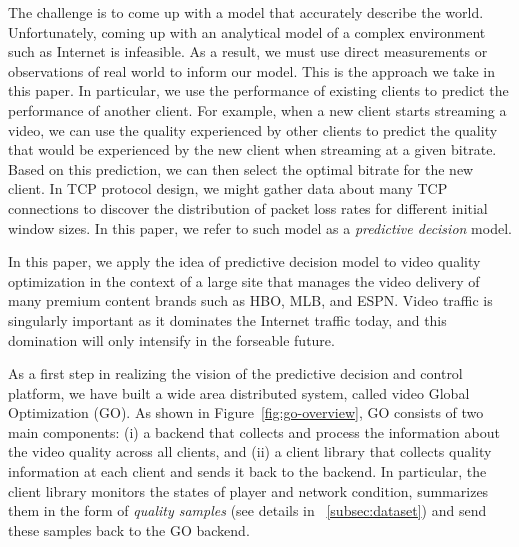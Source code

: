 The challenge is to come up with a model that accurately describe the
world. Unfortunately, coming up with an analytical model of a complex
environment such as Internet is infeasible. As a result, we must use
direct measurements or observations of real world to inform our
model. This is the approach we take in this paper. In particular, we
use the performance of existing clients to predict the performance of
another client. For example, when a new client starts streaming a
video, we can use the quality experienced by other clients to predict
the quality that would be experienced by the new client when streaming
at a given bitrate. Based on this prediction, we can then select the
optimal bitrate for the new client.  In TCP protocol design, we might
gather data about many TCP connections to discover the distribution of
packet loss rates for different initial window sizes.  
In this paper, we refer to such model as a {\it predictive decision} model.



\label{subsec:gooverview}

In this paper, we apply the idea of predictive decision model to video
quality optimization in the context of a large site that manages the
video delivery of many premium content brands such as HBO, MLB, and
ESPN. Video traffic is singularly important as it dominates the
Internet traffic today, and this domination will only intensify in the
forseable future.

As a first step in realizing the vision of the predictive decision and control 
platform, we have built a wide area distributed system, called video Global 
Optimization (GO). As shown in
Figure~\ref{fig:go-overview}, GO consists of two main components: (i)
a backend that collects and process the information about the video
quality across all clients, and (ii) a client library that collects
quality information at each client and sends it back to the backend. In
particular, the client library monitors the states of player and
network condition, summarizes them in the form of \emph{quality
  samples} (see details in \Section~\ref{subsec:dataset}) and send
these samples back to the GO backend.

